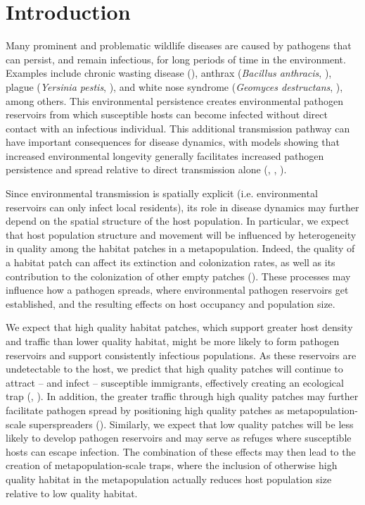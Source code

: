 \documentclass{article}
\begin{document}
\section{Introduction}
\label{intro}

Many prominent and problematic wildlife diseases are caused by pathogens that can persist, and remain infectious, for long periods of time in the environment.  Examples include chronic wasting disease (\cite{Miller2006}), anthrax (\emph{Bacillus anthracis}, \cite{Dragon1995}), plague (\emph{Yersinia pestis}, \cite{Eisen2008}), and white nose syndrome (\emph{Geomyces destructans}, \cite{Lindner2011}), among others.  This environmental persistence creates environmental pathogen reservoirs from which susceptible hosts can become infected without direct contact with an infectious individual.  This additional transmission pathway can have important consequences for disease dynamics, with models showing that increased environmental longevity generally facilitates increased pathogen persistence and spread relative to direct transmission alone (\cite{Almberg2011}, \cite{Sharp2011}, \cite{Breban2009}). 

Since environmental transmission is spatially explicit (i.e. environmental reservoirs can only infect local residents), its role in disease dynamics may further depend on the spatial structure of the host population.  In particular, we expect that host population structure and movement will be influenced by heterogeneity in quality among the habitat patches in a metapopulation.  Indeed, the quality of a habitat patch can affect its extinction and colonization rates, as well as its contribution to the colonization of other empty patches (\cite{Moilanen1998}).  These processes may influence how a pathogen spreads, where environmental pathogen reservoirs get established, and the resulting effects on host occupancy and population size.  

We expect that high quality habitat patches, which support greater host density and traffic than lower quality habitat, might be more likely to form pathogen reservoirs and support consistently infectious populations.  As these reservoirs are undetectable to the host, we predict that high quality patches will continue to attract -- and infect -- susceptible immigrants, effectively creating an ecological trap (\cite{Robertson2006}, \cite{Almberg2011}).  In addition, the greater traffic through high quality patches may further facilitate pathogen spread by positioning high quality patches as metapopulation-scale superspreaders (\cite{Paull2012}).  Similarly, we expect that low quality patches will be less likely to develop pathogen reservoirs and may serve as refuges where susceptible hosts can escape infection.
The combination of these effects may then lead to the creation of metapopulation-scale traps, where the inclusion of otherwise high quality habitat in the metapopulation actually reduces host population size relative to low quality habitat.
\end{document}
